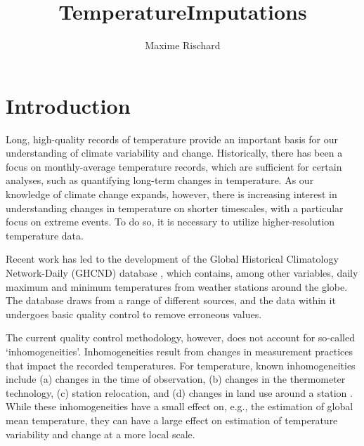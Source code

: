 \documentclass[letter]{article}
\title{TemperatureImputations}
\author{Maxime Rischard}
\begin{document}
    
    
    
    \maketitle
    
    
	\tableofcontents


    






        \section{Introduction}\label{introduction}
    

Long, high-quality records of temperature provide an important basis for our understanding of climate variability and change. Historically, there has been a focus on monthly-average temperature records, which are sufficient for certain analyses, such as quantifying long-term changes in temperature. As our knowledge of climate change expands, however, there is increasing interest in understanding changes in temperature on shorter timescales, with a particular focus on extreme events. To do so, it is necessary to utilize higher-resolution temperature data. 

Recent work has led to the development of the Global Historical Climatology Network-Daily (GHCND) database \citep{menne2012overview}, which contains, among other variables, daily maximum and minimum temperatures from weather stations around the globe. The database draws from a range of different sources, and the data within it undergoes basic quality control to remove erroneous values. 

The current quality control methodology, however, does not account for so-called `inhomogeneities'. Inhomogeneities result from changes in measurement practices that impact the recorded temperatures. For temperature, known inhomogeneities include (a) changes in the time of observation, (b) changes in the thermometer technology, (c) station relocation, and (d) changes in land use around a station \citep{menne2009us}. While these inhomogeneities have a small effect on, e.g., the estimation of global mean temperature, they can have a large effect on estimation of temperature variability and change at a more local scale.
\end{document}

